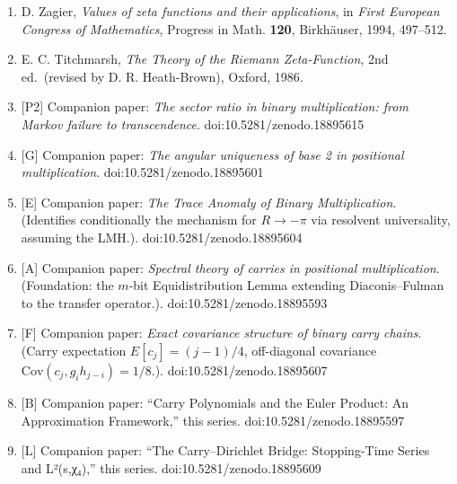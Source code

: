 \documentclass[
  11pt,
]{article}
\begin{document}
\begin{enumerate}
\item
  D. Zagier, \emph{Values of zeta functions and their applications}, in
  \emph{First European Congress of Mathematics}, Progress in Math. \textbf{120},
  Birkhäuser, 1994, 497--512.
\item
  E. C. Titchmarsh, \emph{The Theory of the Riemann Zeta-Function}, 2nd
  ed.~(revised by D. R. Heath-Brown), Oxford, 1986.
\item
  {[}P2{]} Companion paper: \emph{The sector ratio in binary multiplication:
  from Markov failure to transcendence}. doi:10.5281/zenodo.18895615
\item
  {[}G{]} Companion paper: \emph{The angular uniqueness of base 2 in positional
  multiplication}. doi:10.5281/zenodo.18895601
\item
  {[}E{]} Companion paper: \emph{The Trace Anomaly of Binary Multiplication}.
  (Identifies conditionally the mechanism for \(R \to -\pi\) via resolvent
  universality, assuming the LMH.). doi:10.5281/zenodo.18895604
\item
  {[}A{]} Companion paper: \emph{Spectral theory of carries in positional
  multiplication}. (Foundation: the \(m\)-bit Equidistribution Lemma extending
  Diaconis--Fulman to the transfer operator.). doi:10.5281/zenodo.18895593
\item
  {[}F{]} Companion paper: \emph{Exact covariance structure of binary carry
  chains}. (Carry expectation \(E[c_j] = (j-1)/4\), off-diagonal covariance
  \(\text{Cov}(c_j, g_i h_{j-i}) = 1/8\).). doi:10.5281/zenodo.18895607
\item
  {[}B{]} Companion paper: ``Carry Polynomials and the Euler Product: An
  Approximation Framework,'' this series. doi:10.5281/zenodo.18895597
\item
  {[}L{]} Companion paper: ``The Carry--Dirichlet Bridge: Stopping-Time Series
  and L²(s,χ₄),'' this series. doi:10.5281/zenodo.18895609
\end{enumerate}
\end{document}
